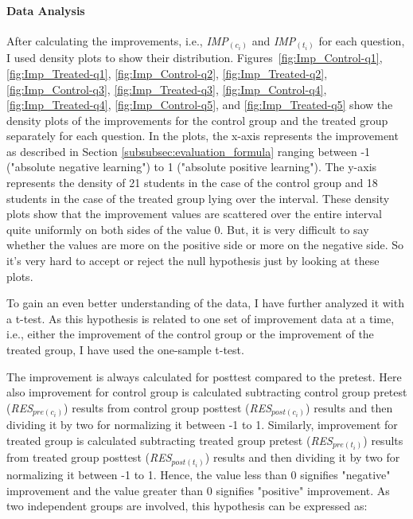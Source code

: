 \paragraph{Data Analysis}
After calculating the improvements, i.e., \textit{IMP$_{(c_i)}$} and \textit{IMP$_{(t_i)}$} for each question, I used density plots to show their distribution. Figures~\ref{fig:Imp_Control-q1}, \ref{fig:Imp_Treated-q1}, \ref{fig:Imp_Control-q2}, \ref{fig:Imp_Treated-q2}, \ref{fig:Imp_Control-q3}, \ref{fig:Imp_Treated-q3}, \ref{fig:Imp_Control-q4}, \ref{fig:Imp_Treated-q4}, \ref{fig:Imp_Control-q5}, and \ref{fig:Imp_Treated-q5} show the density plots of the improvements for the control group and the treated group separately for each question. In the plots, the x-axis represents the improvement as described in Section \ref{subsubsec:evaluation_formula} ranging between -1 ("absolute negative learning") to 1 ("absolute positive learning"). The y-axis represents the density of 21 students in the case of the control group and 18 students in the case of the treated group lying over the interval.
These density plots show that the improvement values are scattered over the entire interval quite uniformly on both sides of the value 0. But, it is very difficult to say whether the values are more on the positive side or more on the negative side. So it's very hard to accept or reject the null hypothesis just by looking at these plots.

To gain an even better understanding of the data, I have further analyzed it with a t-test. As this hypothesis is related to one set of improvement data at a time, i.e., either the improvement of the control group or the improvement of the treated group, I have used the one-sample t-test.   

The improvement is always calculated for posttest compared to the pretest. Here also improvement for control group is calculated subtracting control group pretest (\textit{RES$_{pre(c_i)}$}) results from control group posttest (\textit{RES$_{post(c_i)}$}) results and then dividing it by two for normalizing it between -1 to 1. Similarly, improvement for treated group is calculated subtracting treated group pretest (\textit{RES$_{pre(t_i)}$}) results from treated group posttest (\textit{RES$_{post(t_i)}$}) results and then dividing it by two for normalizing it between -1 to 1. Hence, the value less than 0 signifies "negative" improvement and the value greater than 0 signifies "positive" improvement. As two independent groups are involved, this hypothesis can be expressed as:   

